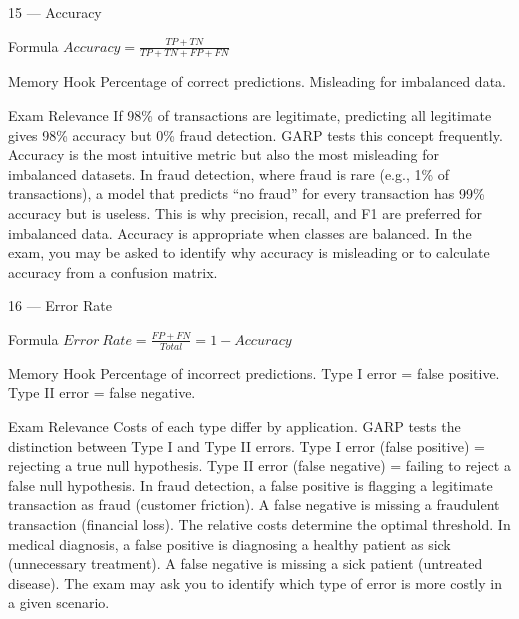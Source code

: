 \documentclass[aspectratio=169,8pt]{beamer}
\begin{document}
	\begin{frame}{15 --- Accuracy}
		\begin{block}{Formula}
			$Accuracy = \frac{TP + TN}{TP + TN + FP + FN}$
		\end{block}
		\begin{block}{Memory Hook}
			Percentage of correct predictions. Misleading for imbalanced data.
		\end{block}
		\begin{block}{Exam Relevance}
			If 98\% of transactions are legitimate, predicting all legitimate gives 98\% accuracy but 0\% fraud detection. GARP tests this concept frequently. Accuracy is the most intuitive metric but also the most misleading for imbalanced datasets. In fraud detection, where fraud is rare (e.g., 1\% of transactions), a model that predicts ``no fraud'' for every transaction has 99\% accuracy but is useless. This is why precision, recall, and F1 are preferred for imbalanced data. Accuracy is appropriate when classes are balanced. In the exam, you may be asked to identify why accuracy is misleading or to calculate accuracy from a confusion matrix.
		\end{block}
	\end{frame}
	
	\begin{frame}{16 --- Error Rate}
		\begin{block}{Formula}
			$Error\ Rate = \frac{FP + FN}{Total} = 1 - Accuracy$
		\end{block}
		\begin{block}{Memory Hook}
			Percentage of incorrect predictions. Type I error = false positive. Type II error = false negative.
		\end{block}
		\begin{block}{Exam Relevance}
			Costs of each type differ by application. GARP tests the distinction between Type I and Type II errors. Type I error (false positive) = rejecting a true null hypothesis. Type II error (false negative) = failing to reject a false null hypothesis. In fraud detection, a false positive is flagging a legitimate transaction as fraud (customer friction). A false negative is missing a fraudulent transaction (financial loss). The relative costs determine the optimal threshold. In medical diagnosis, a false positive is diagnosing a healthy patient as sick (unnecessary treatment). A false negative is missing a sick patient (untreated disease). The exam may ask you to identify which type of error is more costly in a given scenario.
		\end{block}
	\end{frame}
	
\end{document}
